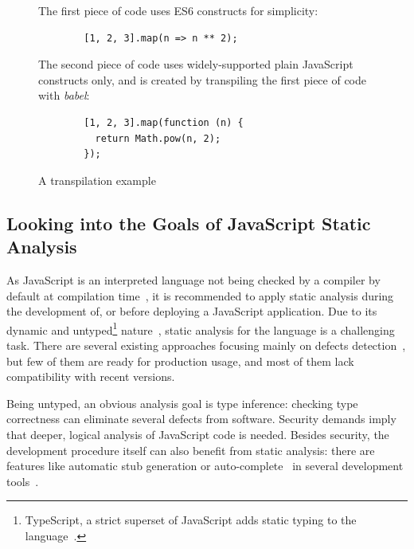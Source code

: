 \vspace{1em}
\begin{figure}[!htb]
	\centering
	\begin{minipage}{25em}
		The first piece of code uses ES6 constructs for simplicity:

		\begin{verbatim}
		[1, 2, 3].map(n => n ** 2);
		\end{verbatim}

		The second piece of code uses widely-supported plain JavaScript constructs only, and is created by transpiling the first piece of code with \emph{babel}:

		\begin{verbatim}
		[1, 2, 3].map(function (n) {
		  return Math.pow(n, 2);
		});
		\end{verbatim}
	\end{minipage}
  \caption{A transpilation example}
  \label{fig:transpiling-example}
\end{figure}


\subsection{Looking into the Goals of JavaScript Static Analysis}

As JavaScript is an interpreted language not being checked by a compiler by default at compilation time~\cite{373902}, it is recommended to apply static analysis during the development of, or before deploying a JavaScript application. Due to its dynamic and untyped\footnote{TypeScript, a strict superset of JavaScript adds static typing to the language~\cite{typescript-website}.} nature~\cite{flanagan2006javascript}, static analysis for the language is a challenging task. There are several existing approaches focusing mainly on defects detection~\cite{madsen2013practical, livshits2010gulfstream, jensen2009type}, but few of them are ready for production usage, and most of them lack compatibility with recent \es versions.

Being untyped, an obvious analysis goal is type inference: checking type correctness can eliminate several defects from software. Security demands imply that deeper, logical analysis of JavaScript code is needed. Besides security, the development procedure itself can also benefit from static analysis: there are features like automatic stub generation or auto-complete~\cite{madsen2013practical} in several development tools~\cite{esprima-autocomplete, webstorm-autocomplete}.


